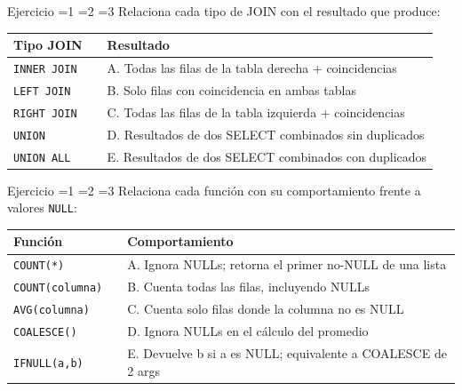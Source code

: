 \documentclass[12pt, a4paper]{article}
\newcommand{\blank}[1][4cm]{\underline{\hspace{#1}}}
\newcommand{\estrella}{{\color{Goldenrod}\faStarSolid}}
\newcommand{\estrellavacia}{{\color{gray!45}\faStarSolid}}
\newcommand{\nivel}[1]{%
  \ifnum#1=1\estrella\estrellavacia\estrellavacia\fi
  \ifnum#1=2\estrella\estrella\estrellavacia\fi
  \ifnum#1=3\estrella\estrella\estrella\fi
}
\newcounter{numej}
\newcommand{\ej}{\stepcounter{numej}\thenumej}
\begin{document}
\begin{ejercicio}{Ejercicio \ej}{\nivel{2}}
Relaciona cada tipo de JOIN con el resultado que produce:

\vspace{6pt}
\begin{center}
\small
\renewcommand{\arraystretch}{1.5}
\begin{tabular}{@{} p{3.5cm} p{0.8cm} p{9cm} @{}}
  \toprule
  \textbf{Tipo JOIN} & & \textbf{Resultado} \\
  \midrule
  \texttt{INNER JOIN}  & \blank[0.6cm] & A. Todas las filas de la tabla derecha + coincidencias \\
  \texttt{LEFT JOIN}   & \blank[0.6cm] & B. Solo filas con coincidencia en ambas tablas \\
  \texttt{RIGHT JOIN}  & \blank[0.6cm] & C. Todas las filas de la tabla izquierda + coincidencias \\
  \texttt{UNION}       & \blank[0.6cm] & D. Resultados de dos SELECT combinados sin duplicados \\
  \texttt{UNION ALL}   & \blank[0.6cm] & E. Resultados de dos SELECT combinados con duplicados \\
  \bottomrule
\end{tabular}
\end{center}
\end{ejercicio}

\begin{ejercicio}{Ejercicio \ej}{\nivel{2}}
Relaciona cada función con su comportamiento frente a valores \texttt{NULL}:

\vspace{6pt}
\begin{center}
\small
\renewcommand{\arraystretch}{1.5}
\begin{tabular}{@{} p{4cm} p{0.8cm} p{8cm} @{}}
  \toprule
  \textbf{Función} & & \textbf{Comportamiento} \\
  \midrule
  \texttt{COUNT(*)}       & \blank[0.6cm] & A. Ignora NULLs; retorna el primer no-NULL de una lista \\
  \texttt{COUNT(columna)} & \blank[0.6cm] & B. Cuenta todas las filas, incluyendo NULLs \\
  \texttt{AVG(columna)}   & \blank[0.6cm] & C. Cuenta solo filas donde la columna no es NULL \\
  \texttt{COALESCE()}     & \blank[0.6cm] & D. Ignora NULLs en el cálculo del promedio \\
  \texttt{IFNULL(a,b)}    & \blank[0.6cm] & E. Devuelve b si a es NULL; equivalente a COALESCE de 2 args \\
  \bottomrule
\end{tabular}
\end{center}
\end{ejercicio}
\end{document}

